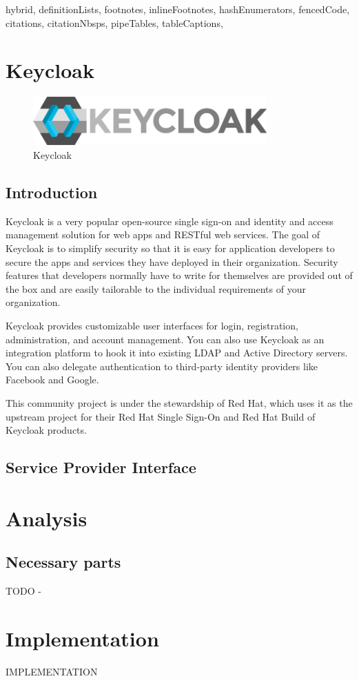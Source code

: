 \documentclass[
  digital,     %
  oneside,     %
  nosansbold,  %
  nocolorbold, %
  lof,         %
  lot,         %
]{fithesis4}
\begin{document}
\begin{markdown*}{%
  hybrid,
  definitionLists,
  footnotes,
  inlineFootnotes,
  hashEnumerators,
  fencedCode,
  citations,
  citationNbsps,
  pipeTables,
  tableCaptions,
}
\chapter{Keycloak}

\begin{figure}[htbp]
  \centering
  \includegraphics[width=0.8\textwidth]{img/keycloak.png}
  \caption{Keycloak}
  \label{fig:keycloak-logo}
\end{figure}

\section{Introduction}
Keycloak is a very popular open-source single sign-on and identity and access management solution for web apps and RESTful web services.
The goal of Keycloak is to simplify security so that it is easy for application developers to secure the apps and services they have deployed in their organization.
Security features that developers normally have to write for themselves are provided out of the box and are easily tailorable to the individual requirements of your organization.

Keycloak provides customizable user interfaces for login, registration, administration, and account management.
You can also use Keycloak as an integration platform to hook it into existing LDAP and Active Directory servers.
You can also delegate authentication to third-party identity providers like Facebook and Google.

This community project is under the stewardship of Red Hat, which uses it as the upstream project for their Red Hat Single Sign-On and Red Hat Build of Keycloak products.


\section{Service Provider Interface}

\chapter{Analysis}
\shorthandoff{-}


\section{Necessary parts}
TODO -


\shorthandon{-}


\chapter{Implementation}
\shorthandoff{-}

IMPLEMENTATION
\end{markdown*}
\end{document}
